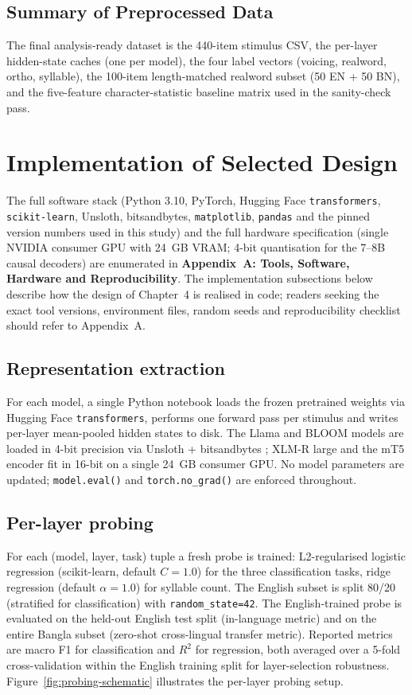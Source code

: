 \subsection{Summary of Preprocessed Data}

The final analysis-ready dataset is the 440-item stimulus CSV, the per-layer hidden-state caches (one per model), the four label vectors (voicing, realword, ortho, syllable), the 100-item length-matched realword subset (50 EN + 50 BN), and the five-feature character-statistic baseline matrix used in the sanity-check pass.

\section{Implementation of Selected Design}

The full software stack (Python 3.10, PyTorch, Hugging Face \texttt{transformers}, \texttt{scikit-learn}, Unsloth, bitsandbytes, \texttt{matplotlib}, \texttt{pandas} and the pinned version numbers used in this study) and the full hardware specification (single NVIDIA consumer GPU with 24~GB VRAM; 4-bit quantisation for the 7--8B causal decoders) are enumerated in \textbf{Appendix~A: Tools, Software, Hardware and Reproducibility}. The implementation subsections below describe how the design of Chapter~4 is realised in code; readers seeking the exact tool versions, environment files, random seeds and reproducibility checklist should refer to Appendix~A.

\subsection{Representation extraction}

For each model, a single Python notebook loads the frozen pretrained weights via Hugging Face \texttt{transformers}, performs one forward pass per stimulus and writes per-layer mean-pooled hidden states to disk. The Llama and BLOOM models are loaded in 4-bit precision via Unsloth + bitsandbytes \cite{dettmers2022bnb}; XLM-R large and the mT5 encoder fit in 16-bit on a single 24~GB consumer GPU. No model parameters are updated; \texttt{model.eval()} and \texttt{torch.no\_grad()} are enforced throughout.

\subsection{Per-layer probing}

For each (model, layer, task) tuple a fresh probe is trained: L2-regularised logistic regression (scikit-learn, default $C=1.0$) for the three classification tasks, ridge regression (default $\alpha=1.0$) for syllable count. The English subset is split 80/20 (stratified for classification) with \texttt{random\_state=42}. The English-trained probe is evaluated on the held-out English test split (in-language metric) and on the entire Bangla subset (zero-shot cross-lingual transfer metric). Reported metrics are macro F1 for classification and $R^2$ for regression, both averaged over a 5-fold cross-validation within the English training split for layer-selection robustness. Figure~\ref{fig:probing-schematic} illustrates the per-layer probing setup.

